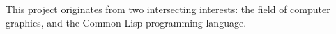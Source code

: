 This project originates from two intersecting interests:
the field of computer graphics,
and the Common Lisp programming language.
